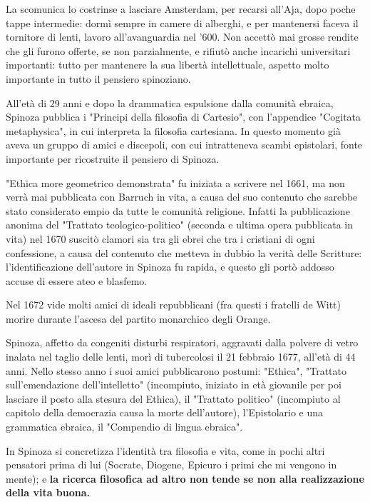 La scomunica lo costrinse a lasciare Amsterdam, per recarsi all'Aja, dopo poche tappe intermedie: dormì sempre in camere di alberghi, e per mantenersi faceva il tornitore di lenti, lavoro all'avanguardia nel '600. Non accettò mai grosse rendite che gli furono offerte, se non parzialmente, e rifiutò anche incarichi universitari importanti: tutto per mantenere la sua libertà intellettuale, aspetto molto importante in tutto il pensiero spinoziano.

All'età di 29 anni e dopo la drammatica espulsione dalla comunità ebraica, Spinoza pubblica i "Principi della filosofia di Cartesio", con l'appendice "Cogitata metaphysica", in cui interpreta la filosofia cartesiana. In questo momento già aveva un gruppo di amici e discepoli, con cui intratteneva scambi epistolari, fonte importante per ricostruite il pensiero di Spinoza.

"Ethica more geometrico demonstrata" fu iniziata a scrivere nel 1661, ma non verrà mai pubblicata con Barruch in vita, a causa del suo contenuto che sarebbe stato considerato empio da tutte le comunità religione. Infatti la pubblicazione anonima del "Trattato teologico-politico" (seconda e ultima opera pubblicata in vita) nel 1670 suscitò clamori sia tra gli ebrei che tra i cristiani di ogni confessione, a causa del contenuto che metteva in dubbio la verità delle Scritture: l'identificazione dell'autore in Spinoza fu rapida, e questo gli portò addosso accuse di essere ateo e blasfemo.

Nel 1672 vide molti amici di ideali repubblicani (fra questi i fratelli de Witt) morire durante l'ascesa del partito monarchico degli Orange.

Spinoza, affetto da congeniti disturbi respiratori, aggravati dalla polvere di vetro inalata nel taglio delle lenti, morì di tubercolosi il 21 febbraio 1677, all'età di 44 anni. Nello stesso anno i suoi amici pubblicarono postumi: "Ethica", "Trattato sull'emendazione dell'intelletto" (incompiuto, iniziato in età giovanile per poi lasciare il posto alla stesura del Ethica), il "Trattato politico" (incompiuto al capitolo della democrazia causa la morte dell'autore), l'Epistolario e una grammatica ebraica, il "Compendio di lingua ebraica".

In Spinoza si concretizza l’identità tra filosofia e vita, come in pochi altri pensatori prima di lui (Socrate, Diogene, Epicuro i primi che mi vengono in mente); e \textbf{la ricerca filosofica ad altro non tende se non alla realizzazione della vita buona.}
\newpage